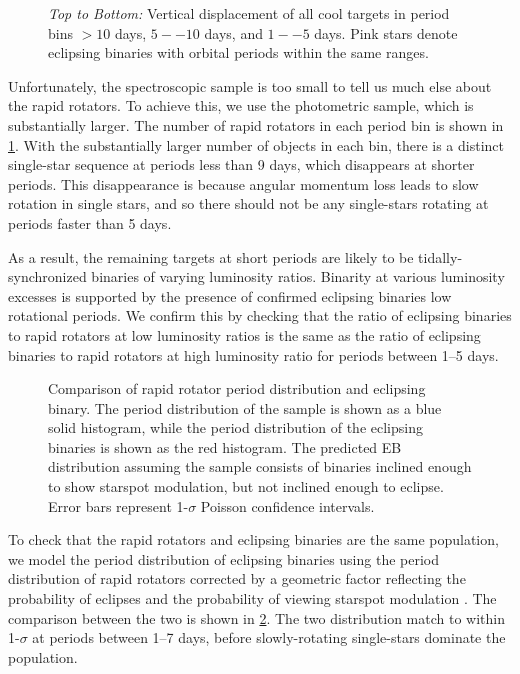\documentclass[manuscript]{aastex6}
\begin{document}
\begin{figure}[htb]
    \centering
    \caption{\emph{Top to Bottom:} Vertical displacement of all cool
        \citet{McQuillan14} targets in period bins \(> 10\) days, \(5--10\)
        days, and \(1--5\) days. Pink stars denote eclipsing binaries with
    orbital periods within the same ranges.}\label{fig:mcq_rapid_excess}
\end{figure}

Unfortunately, the spectroscopic sample is too small to tell us much else about
the rapid rotators. To achieve this, we use the photometric sample, which is
substantially larger. The number of rapid rotators in each period bin is shown
in \cref{fig:mcq_rapid_excess}. With the substantially larger number of objects
in each bin, there is a distinct single-star sequence at
periods less than 9 days, which disappears at shorter periods. This
disappearance is because angular momentum loss leads to slow rotation in single
stars, and so there should not be any single-stars rotating at periods faster
than 5 days.

As a result, the remaining targets at short periods are likely to be
tidally-synchronized binaries of varying luminosity ratios. Binarity at various
luminosity excesses is supported by the presence of confirmed eclipsing
binaries low rotational periods. We confirm this by checking that the ratio of
eclipsing binaries to rapid rotators at low luminosity ratios is the same as
the ratio of eclipsing binaries to rapid rotators at high luminosity ratio for
periods between 1--5 days.

\begin{figure}[htb]
    \centering
    \caption{Comparison of rapid rotator period distribution and eclipsing
    binary. The period distribution of the \citep{McQuillan14} sample is shown
as a blue solid histogram, while the period distribution of the eclipsing binaries
is shown as the red histogram. The predicted EB distribution assuming the
\citep{McQuillan14} sample consists of binaries inclined enough to show
starspot modulation, but not inclined enough to eclipse. Error bars represent
1-\(\sigma\) Poisson confidence intervals.}\label{fig:eclipseprob}
\end{figure}

To check that the rapid rotators and eclipsing binaries are the same
population, we model the period distribution of eclipsing binaries using the 
period distribution of rapid rotators corrected by a geometric factor
reflecting the probability of eclipses \citep{Kirk16} and the probability of
viewing starspot modulation \citep{Jackson10}. The comparison between the two
is shown in \cref{fig:eclipseprob}. The two distribution match to within
1-\(\sigma\) at periods between 1--7 days, before slowly-rotating single-stars 
dominate the population.
\end{document}
